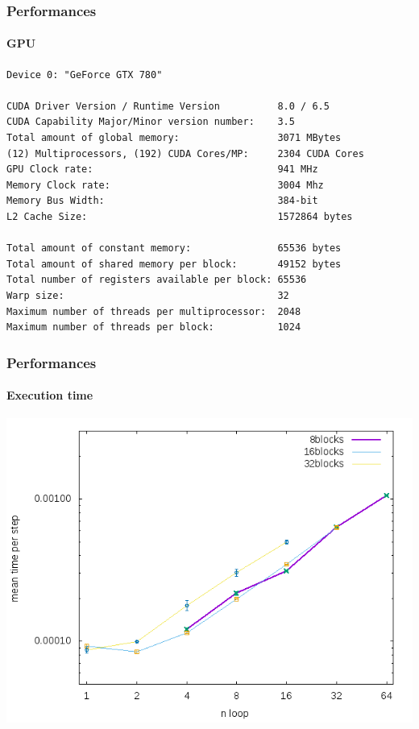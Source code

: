 \begin{frame}[fragile]
\frametitle{Performances}
\framesubtitle{GPU}
\begin{lstlisting}
Device 0: "GeForce GTX 780"

CUDA Driver Version / Runtime Version          8.0 / 6.5
CUDA Capability Major/Minor version number:    3.5
Total amount of global memory:                 3071 MBytes
(12) Multiprocessors, (192) CUDA Cores/MP:     2304 CUDA Cores
GPU Clock rate:                                941 MHz
Memory Clock rate:                             3004 Mhz
Memory Bus Width:                              384-bit
L2 Cache Size:                                 1572864 bytes

Total amount of constant memory:               65536 bytes
Total amount of shared memory per block:       49152 bytes
Total number of registers available per block: 65536
Warp size:                                     32
Maximum number of threads per multiprocessor:  2048
Maximum number of threads per block:           1024
\end{lstlisting}
\begin{center}

\end{center}
\end{frame}

\begin{frame}
\frametitle{Performances}
\framesubtitle{Execution time}
\begin{center}
\includegraphics[scale=0.5]{../check/time/speed.png}
\end{center}
\end{frame}

